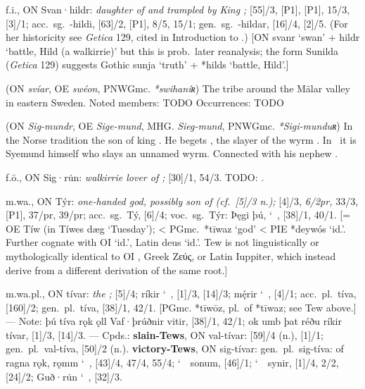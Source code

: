 \begin{itemize}
 f.i., ON Svan·hildr:
  \emph{daughter of  and  trampled by King ;} [55]/3, [P1], [P1], 15/3, [3]/1; acc.~sg.~-hildi, [63]/2, [P1], 8/5, 15/1; gen.~sg.~-hildar, [16]/4, [2]/5.
  (For her historicity see \emph{Getica} 129, cited in Introduction to .)
  [ON svanr ‘swan’ + hildr ‘battle, Hild (a walkirrie)’ but this is prob.~later reanalysis; the form Sunilda (\emph{Getica} 129) suggests Gothic sunja ‘truth’ + *hilds ‘battle, Hild’.]

 (ON \emph{svíar}, OE \emph{swéon}, PNWGmc. \emph{*swihaníʀ})
  The tribe around the Mälar valley in eastern Sweden.
  Noted members: TODO
  Occurrences: TODO

 (ON \emph{Sig-mundr}, OE \emph{Sige-mund}, MHG. \emph{Sieg-mund}, PNWGmc. \emph{*Sigi-munduʀ})
  In the Norse tradition the son of king .  He begets , the slayer of the wyrm .  In \Beowulf\ it is Syemund himself who slays an unnamed wyrm.  Connected with his nephew .

 f.ō., ON Sig·ru̇n:
  \emph{walkirrie lover of ;} [30]/1, 54/3.  TODO: .

 m.wa., ON Týr:
  \emph{one-handed god, possibly son of  (cf.~[5]/3 n.);} [4]/3, \emph{6/2pr,} 33/3, [P1], 37/pr, 39/pr; acc.~sg.~Tý, [6]/4;
  voc.~sg.~Týr: Þęgi þú, \char`~, [38]/1, 40/1.
  [= OE Tíw (in Tíwes dæg ‘Tuesday’); < PGmc.~*tīwaz ‘god’ < PIE *deywós ‘id.’.  Further cognate with OI \emph{} ‘id.’, Latin deus ‘id.’.  Tew is not linguistically or mythologically identical to OI \emph{}, Greek \textgreek{Ζεύς}, or Latin Iuppiter, which instead derive from a different derivation of the same root.]

 m.wa.pl., ON tívar:
  \emph{the ;} [5]/4; ríkir \char`~, [1]/3, [14]/3; mę́rir \char`~, [4]/1; acc.~pl.~tíva, [160]/2; gen.~pl.~tíva, [38]/1, 42/1.
  [PGmc. *tīwōz, pl.~of *tīwaz; see Tew above.]
  --- Note: þú tíva rǫk ǫll Vaf·þrúðnir vitir, [38]/1, 42/1; ok umb þat réðu ríkir tívar, [1]/3, [14]/3.
  --- Cpds.: \textbf{slain-Tews}, ON val-tívar: [59]/4 (n.), [1]/1; gen.~pl.~val-tíva, [50]/2 (n.).
  \textbf{victory-Tews}, ON sig-tívar: gen.~pl.~sig-tíva: of ragna rǫk, rǫmm \char`~, [43]/4, 47/4, 55/4; \char`~\ sonum, [46]/1; \char`~\ synir, [1]/4, 2/2, [24]/2; Guð·ru̇n \char`~, [32]/3.


\end{itemize}
